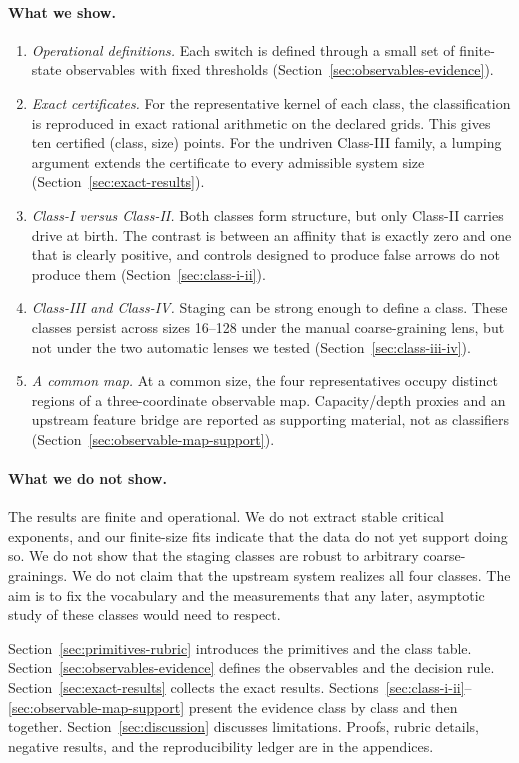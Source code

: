 \paragraph{What we show.}
\begin{enumerate}
  \item \emph{Operational definitions.} Each switch is defined through a small set of finite-state observables with fixed thresholds (Section~\ref{sec:observables-evidence}).
  \item \emph{Exact certificates.} For the representative kernel of each class, the classification is reproduced in exact rational arithmetic on the declared grids. This gives ten certified (class, size) points. For the undriven Class-III family, a lumping argument extends the certificate to every admissible system size (Section~\ref{sec:exact-results}).
  \item \emph{Class-I versus Class-II.} Both classes form structure, but only Class-II carries drive at birth. The contrast is between an affinity that is exactly zero and one that is clearly positive, and controls designed to produce false arrows do not produce them (Section~\ref{sec:class-i-ii}).
  \item \emph{Class-III and Class-IV.} Staging can be strong enough to define a class. These classes persist across sizes 16--128 under the manual coarse-graining lens, but not under the two automatic lenses we tested (Section~\ref{sec:class-iii-iv}).
  \item \emph{A common map.} At a common size, the four representatives occupy distinct regions of a three-coordinate observable map. Capacity/depth proxies and an upstream feature bridge are reported as supporting material, not as classifiers (Section~\ref{sec:observable-map-support}).
\end{enumerate}

\paragraph{What we do not show.} The results are finite and operational. We do not extract stable critical exponents, and our finite-size fits indicate that the data do not yet support doing so. We do not show that the staging classes are robust to arbitrary coarse-grainings. We do not claim that the upstream system realizes all four classes. The aim is to fix the vocabulary and the measurements that any later, asymptotic study of these classes would need to respect.

Section~\ref{sec:primitives-rubric} introduces the primitives and the class table. Section~\ref{sec:observables-evidence} defines the observables and the decision rule. Section~\ref{sec:exact-results} collects the exact results. Sections~\ref{sec:class-i-ii}--\ref{sec:observable-map-support} present the evidence class by class and then together. Section~\ref{sec:discussion} discusses limitations. Proofs, rubric details, negative results, and the reproducibility ledger are in the appendices.
